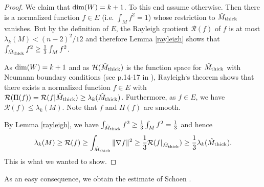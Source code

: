 \documentclass[11pt]{amsart}
\theoremstyle{plain}
\theoremstyle{plain}
\theoremstyle{definition}
\newcommand{\cal}{\mathcal}
\begin{document}
\begin{proof}
We claim that
${\rm dim}(W)=k+1$. To this end assume otherwise. Then there is 
a normalized 
function $f\in E$ (i.e. $\int_M f^2=1$) 
whose restriction to $\hat M_{\rm thick}$ vanishes.
But by the definition of $E$, the Rayleigh quotient 
${\cal R}(f)$ of $f$ is at most $\lambda_k(M)<(n-2)^2/12 $ and therefore 
Lemma \ref{rayleigh} shows that $\int_{\hat M_{\rm thick}}f^2\geq \frac{1}{3}\int_M f^2$.

As ${\rm dim}(W)=k+1$ and as 
${\cal H}(\hat M_{\rm thick})$ is the function space for 
$\hat M_{\rm thick}$ with Neumann boundary conditions (see p.14-17 in \cite{C84}),  
Rayleigh`s theorem shows that 
there exists a normalized function $f\in E$ 
with ${\cal R}(\Pi(f))={\cal R}(f\vert \hat M_{\rm thick})
\geq\lambda_k(\hat M_{\rm thick})$.
Furthermore, as $f\in E$, we have 
${\cal R}(f)\leq \lambda_k(M)$. Note that $f$ and $\Pi(f)$ are smooth. 

By Lemma \ref{rayleigh}, we have
$\int_{\hat M_{\rm thick}}f^2\geq \frac{1}{3}\int_M f^2=\frac{1}{3}$ and hence
\[\lambda_k(M)\geq {\cal R}(f)\geq \int_{\hat M_{\rm thick}}\Vert \nabla f\Vert^2 
\geq \frac{1}{3}{\cal R}(f\vert_{\hat M_{\rm thick}})\geq 
\frac{1}{3}\lambda_k(\hat M_{\rm thick}).\] 
This is what we wanted to show.
\end{proof}


As an easy consequence, we obtain the estimate of Schoen \cite{S82}.
\end{document}
